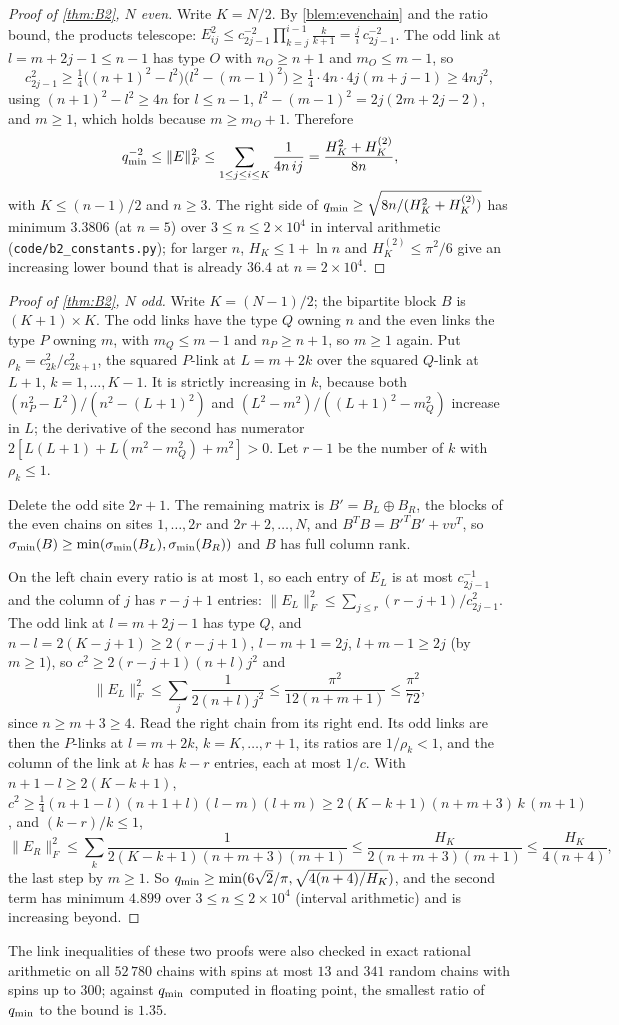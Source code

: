 \begin{proof}[Proof of \cref{thm:B2}, $N$ even]
Write $K=N/2$. By \cref{blem:evenchain} and the ratio bound, the products telescope:
$E_{ij}^2\le c_{2j-1}^{-2}\prod_{k=j}^{i-1}\frac k{k+1}=\frac ji\,c_{2j-1}^{-2}$. The odd
link at $l=m+2j-1\le n-1$ has type $O$ with $n_O\ge n+1$ and $m_O\le m-1$, so
\[
  c_{2j-1}^2\ge\tfrac14\bigl((n+1)^2-l^2\bigr)\bigl(l^2-(m-1)^2\bigr)\ge\tfrac14\cdot4n\cdot4j(m+j-1)\ge4nj^2,
\]
using $(n+1)^2-l^2\ge4n$ for $l\le n-1$, $l^2-(m-1)^2=2j(2m+2j-2)$, and $m\ge1$, which
holds because $m\ge m_O+1$. Therefore
\[
  q_{\min}^{-2}\le\|E\|_F^2\le\sum_{1\le j\le i\le K}\frac1{4n\,ij}=\frac{H_K^2+H_K^{(2)}}{8n},
\]
with $K\le(n-1)/2$ and $n\ge3$. The right side of $q_{\min}\ge\sqrt{8n/(H_K^2+H_K^{(2)})}$ has
minimum $3.3806$ (at $n=5$) over $3\le n\le2\times10^4$ in interval arithmetic
(\texttt{code/b2\_constants.py}); for larger $n$, $H_K\le1+\ln n$ and $H_K^{(2)}\le\pi^2/6$
give an increasing lower bound that is already $36.4$ at $n=2\times10^4$.
\end{proof}

\begin{proof}[Proof of \cref{thm:B2}, $N$ odd]
Write $K=(N-1)/2$; the bipartite block $B$ is $(K+1)\times K$. The odd links have the type
$Q$ owning $n$ and the even links the type $P$ owning $m$, with $m_Q\le m-1$ and
$n_P\ge n+1$, so $m\ge1$ again. Put $\rho_k=c_{2k}^2/c_{2k+1}^2$, the squared $P$-link at $L=m+2k$ over the squared $Q$-link at
$L+1$, $k=1,\dots,K-1$. It is strictly increasing in $k$, because both
$(n_P^2-L^2)/(n^2-(L+1)^2)$ and $(L^2-m^2)/((L+1)^2-m_Q^2)$ increase in $L$; the derivative
of the second has numerator $2[L(L+1)+L(m^2-m_Q^2)+m^2]>0$. Let $r-1$ be the number of
$k$ with $\rho_k\le1$.

Delete the odd site $2r+1$. The remaining matrix is $B'=B_L\oplus B_R$, the blocks of the
even chains on sites $1,\dots,2r$ and $2r+2,\dots,N$, and $B^TB=B'^TB'+vv^T$, so
$\sigma_{\min}(B)\ge\min(\sigma_{\min}(B_L),\sigma_{\min}(B_R))$ and $B$ has full column rank.

On the left chain every ratio is at most $1$, so each entry of $E_L$ is at most
$c_{2j-1}^{-1}$ and the column of $j$ has $r-j+1$ entries:
$\|E_L\|_F^2\le\sum_{j\le r}(r-j+1)/c_{2j-1}^2$. The odd link at $l=m+2j-1$ has type $Q$, and
$n-l=2(K-j+1)\ge2(r-j+1)$, $l-m+1=2j$, $l+m-1\ge2j$ (by $m\ge1$), so
$c^2\ge2(r-j+1)(n+l)j^2$ and
\[
  \|E_L\|_F^2\le\sum_j\frac1{2(n+l)j^2}\le\frac{\pi^2}{12(n+m+1)}\le\frac{\pi^2}{72},
\]
since $n\ge m+3\ge4$. Read the right chain from its right end. Its odd links are then
the $P$-links at $l=m+2k$, $k=K,\dots,r+1$, its ratios are $1/\rho_k<1$, and the column of
the link at $k$ has $k-r$ entries, each at most $1/c$. With $n+1-l\ge2(K-k+1)$,
$c^2\ge\frac14(n+1-l)(n+1+l)(l-m)(l+m)\ge2(K-k+1)(n+m+3)\,k\,(m+1)$, and $(k-r)/k\le1$,
\[
  \|E_R\|_F^2\le\sum_k\frac{1}{2(K-k+1)(n+m+3)(m+1)}\le\frac{H_K}{2(n+m+3)(m+1)}\le\frac{H_K}{4(n+4)},
\]
the last step by $m\ge1$. So $q_{\min}\ge\min(6\sqrt2/\pi,\sqrt{4(n+4)/H_K})$, and the second
term has minimum $4.899$ over $3\le n\le2\times10^4$ (interval arithmetic) and is
increasing beyond.
\end{proof}

The link inequalities of these two proofs were also checked in exact rational arithmetic
on all $52\,780$ chains with spins at most $13$ and $341$ random chains with spins up to
$300$; against $q_{\min}$ computed in floating point, the smallest ratio of $q_{\min}$ to the bound
is $1.35$.

